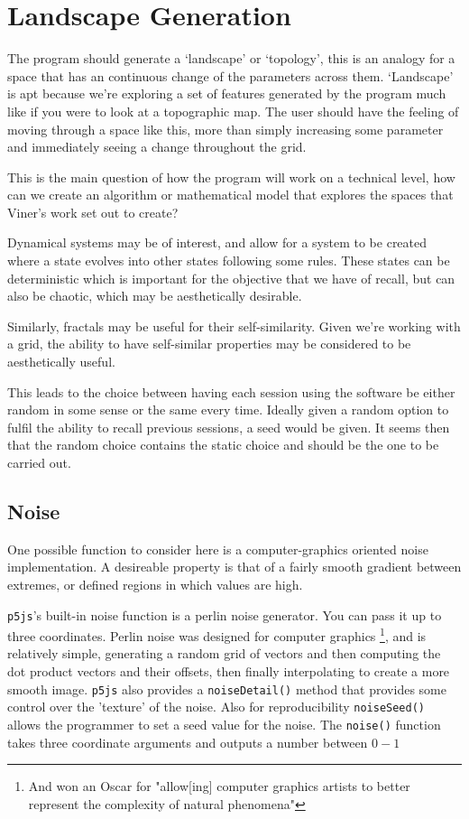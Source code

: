 \section{Landscape Generation}
The program should generate a `landscape' or `topology', this is an analogy for
a space that has an continuous change of the parameters across them. `Landscape'
is apt because we're exploring a set of features generated by the program much
like if you were to look at a topographic map. The user should have the feeling
of moving through a space like this, more than simply increasing some parameter
and immediately seeing a change throughout the grid.

This is the main question of how the program will work on a technical level, how
can we create an algorithm or mathematical model that explores the spaces that
Viner's work set out to create?

Dynamical systems may be of interest, and allow for a system to be created where
a state evolves into other states following some rules. These states can be
deterministic which is important for the objective that we have of recall, but
can also be chaotic, which may be aesthetically desirable.

Similarly, fractals may be useful for their self-similarity. Given we're working
with a grid, the ability to have self-similar properties may be considered to be
aesthetically useful.



This leads to the choice between having each session using the software be
either random in some sense or the same every time. Ideally given a random
option to fulfil the ability to recall previous sessions, a seed would be given.
It seems then that the random choice contains the static choice and should be
the one to be carried out.

\subsection{Noise}
One possible function to consider here is a computer-graphics oriented noise
implementation. A desireable property is that of a fairly smooth gradient
between extremes, or defined regions in which values are high.

\verb|p5js|'s built-in noise function is a perlin noise generator. You can pass
it up to three coordinates. Perlin noise was designed for computer graphics
\footnote{And won an Oscar for "allow[ing] computer graphics artists to better
represent the complexity of natural phenomena"}, and is relatively simple,
generating a random grid of vectors and then computing the dot product vectors
and their offsets, then finally interpolating to create a more smooth image.
\verb|p5js| also provides a \verb|noiseDetail()| method that provides some
control over the 'texture' of the noise. Also for reproducibility
\verb|noiseSeed()| allows the programmer to set a seed value for the noise.
The \verb|noise()| function takes three coordinate arguments and outputs a
number between $0-1$

